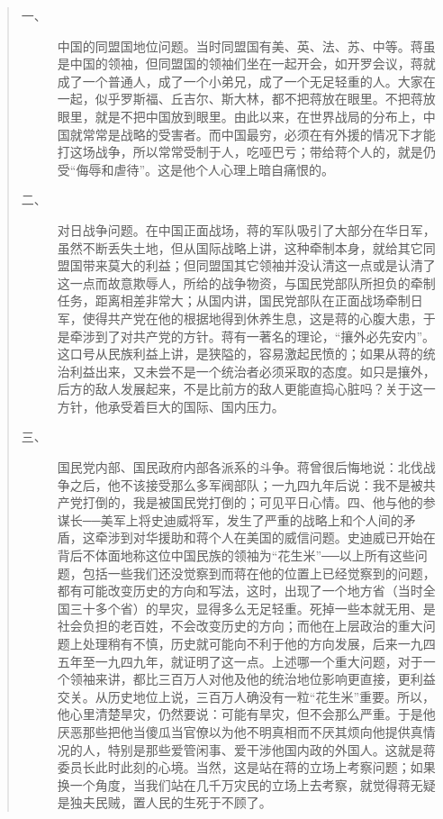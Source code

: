 \begin{quote}
	\begin{description}
		\item [一、] 	中国的同盟国地位问题。当时同盟国有美、英、法、苏、中等。蒋虽是中国的领袖，但同盟国的领袖们坐在一起开会，如开罗会议，蒋就成了一个普通人，成了一个小弟兄，成了一个无足轻重的人。大家在一起，似乎罗斯福、丘吉尔、斯大林，都不把蒋放在眼里。不把蒋放眼里，就是不把中国放到眼里。由此以来，在世界战局的分布上，中国就常常是战略的受害者。而中国最穷，必须在有外援的情况下才能打这场战争，所以常常受制于人，吃哑巴亏；带给蒋个人的，就是仍受“侮辱和虐待”。这是他个人心理上暗自痛恨的。\\
		
		\item [二、] 	对日战争问题。在中国正面战场，蒋的军队吸引了大部分在华日军，虽然不断丢失土地，但从国际战略上讲，这种牵制本身，就给其它同盟国带来莫大的利益；但同盟国其它领袖并没认清这一点或是认清了这一点而故意欺辱人，所给的战争物资，与国民党部队所担负的牵制任务，距离相差非常大；从国内讲，国民党部队在正面战场牵制日军，使得共产党在他的根据地得到休养生息，这是蒋的心腹大患，于是牵涉到了对共产党的方针。蒋有一著名的理论，“攘外必先安内”。这口号从民族利益上讲，是狭隘的，容易激起民愤的；如果从蒋的统治利益出来，又未尝不是一个统治者必须采取的态度。如只是攘外，后方的敌人发展起来，不是比前方的敌人更能直捣心脏吗？关于这一方针，他承受着巨大的国际、国内压力。\\
		
		\item [三、] 	国民党内部、国民政府内部各派系的斗争。蒋曾很后悔地说：北伐战争之后，他不该接受那么多军阀部队；一九四九年后说：我不是被共产党打倒的，我是被国民党打倒的；可见平日心情。四、他与他的参谋长{\Add ──}美军上将史迪威将军，发生了严重的战略上和个人间的矛盾，这牵涉到对华援助和蒋个人在美国的威信问题。史迪威已开始在背后不体面地称这位中国民族的领袖为“花生米”{\Add ──}以上所有这些问题，包括一些我们还没觉察到而蒋在他的位置上已经觉察到的问题，都有可能改变历史的方向和写法，这时，出现了一个地方省（当时全国三十多个省）的旱灾，显得多么无足轻重。死掉一些本就无用、是社会负担的老百姓，不会改变历史的方向；而他在上层政治的重大问题上处理稍有不慎，历史就可能向不利于他的方向发展，后来一九四五年至一九四九年，就证明了这一点。上述哪一个重大问题，对于一个领袖来讲，都比三百万人对他及他的统治地位影响更直接，更利益交关。从历史地位上说，三百万人确没有一粒“花生米”重要。所以，他心里清楚旱灾，仍然要说：可能有旱灾，但不会那么严重。于是他厌恶那些把他当傻瓜当官僚以为他不明真相而不厌其烦向他提供真情况的人，特别是那些爱管闲事、爱干涉他国内政的外国人。这就是蒋委员长此时此刻的心境。当然，这是站在蒋的立场上考察问题；如果换一个角度，当我们站在几千万灾民的立场上去考察，就觉得蒋无疑是独夫民贼，置人民的生死于不顾了。\\
	\end{description}
\end{quote}


